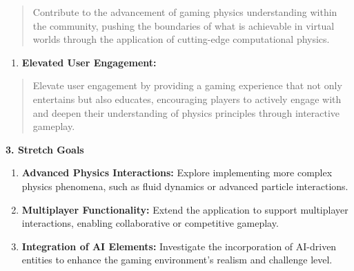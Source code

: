 \documentclass[
]{article}
\begin{document}
\begin{quote}
Contribute to the advancement of gaming physics understanding within the
community, pushing the boundaries of what is achievable in virtual
worlds through the application of cutting-edge computational physics.
\end{quote}

\begin{enumerate}
\def\labelenumi{\arabic{enumi}.}
\setcounter{enumi}{4}
\item
  \textbf{Elevated User Engagement:}
\end{enumerate}

\begin{quote}
Elevate user engagement by providing a gaming experience that not only
entertains but also educates, encouraging players to actively engage
with and deepen their understanding of physics principles through
interactive gameplay.
\end{quote}

\textbf{3. Stretch Goals}

\begin{enumerate}
\def\labelenumi{\arabic{enumi}.}
\item
  \textbf{Advanced Physics Interactions:} Explore implementing more
  complex physics phenomena, such as fluid dynamics or advanced particle
  interactions.
\item
  \textbf{Multiplayer Functionality:} Extend the application to support
  multiplayer interactions, enabling collaborative or competitive
  gameplay.
\item
  \textbf{Integration of AI Elements:} Investigate the incorporation of
  AI-driven entities to enhance the gaming environment's realism and
  challenge level.
\end{enumerate}
\end{document}
